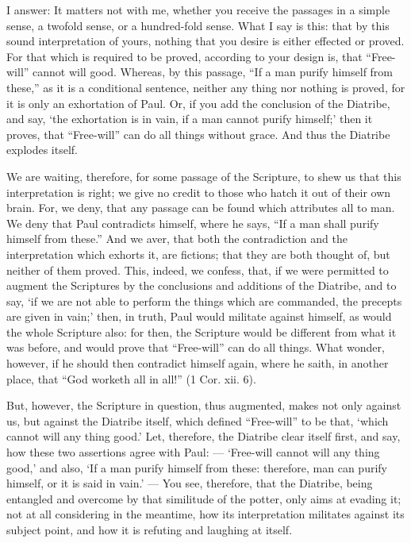 I answer: It matters not with me, whether you receive the passages in a simple sense, a twofold sense, or a hundred-fold sense. What I say is this: that by this sound interpretation of yours, nothing that you desire is either effected or proved. For that which is required to be proved, according to your design is, that “Free-will” cannot will good. Whereas, by this passage, “If a man purify himself from these,” as it is a conditional sentence, neither any thing nor nothing is proved, for it is only an exhortation of Paul. Or, if you add the conclusion of the Diatribe, and say, ‘the exhortation is in vain, if a man cannot purify himself;’ then it proves, that “Free-will” can do all things without grace. And thus the Diatribe explodes itself.

We are waiting, therefore, for some passage of the Scripture, to shew us that this interpretation is right; we give no credit to those who hatch it out of their own brain. For, we deny, that any passage can be found which attributes all to man. We deny that Paul contradicts himself, where he says, “If a man shall purify himself from these.” And we aver, that both the contradiction and the interpretation which exhorts it, are fictions; that they are both thought of, but neither of them proved. This, indeed, we confess, that, if we were permitted to augment the Scriptures by the conclusions and additions of the Diatribe, and to say, ‘if we are not able to perform the things which are commanded, the precepts are given in vain;’ then, in truth, Paul would militate against himself, as would the whole Scripture also: for then, the Scripture would be different from what it was before, and would prove that “Free-will” can do all things. What wonder, however, if he should then contradict himself again, where he saith, in another place, that “God worketh all in all!” (1 Cor. xii. 6).

But, however, the Scripture in question, thus augmented, makes not only against us, but against the Diatribe itself, which defined “Free-will” to be that, ‘which cannot will any thing good.’ Let, therefore, the Diatribe clear itself first, and say, how these two assertions agree with Paul: — ‘Free-will cannot will any thing good,’ and also, ‘If a man purify himself from these: therefore, man can purify himself, or it is said in vain.’ — You see, therefore, that the Diatribe, being entangled and overcome by that similitude of the potter, only aims at evading it; not at all considering in the meantime, how its interpretation militates against its subject point, and how it is refuting and laughing at itself.

